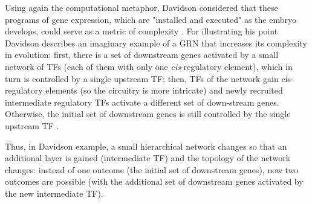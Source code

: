 %

Using again the computational metaphor, Davidson considered that these programs of gene expression, which are "installed and executed" as the embryo develops, could serve as a metric of complexity \citep{Davidson2001}. For illustrating his point Davidson describes an imaginary example of a GRN that increases its complexity in evolution: first, there is a set of downstream genes activated by a small network of TFs (each of them with only one \textit{cis}-regulatory element), which in turn is controlled by a single upstream TF; then, TFs of the network gain cis-regulatory elements (so the circuitry is more intricate) and newly recruited intermediate regulatory TFs activate a different set of down-stream genes. Otherwise, the initial set of downstream genes is still controlled by the single upstream TF \citep{Davidson2001}.
   
Thus, in Davidson example, a small hierarchical network changes so that an additional layer is gained (intermediate TF) and the topology of the network changes: instead of one outcome (the initial set of downstream genes), now two outcomes are possible (with the additional set of downstream genes activated by the new intermediate TF).

